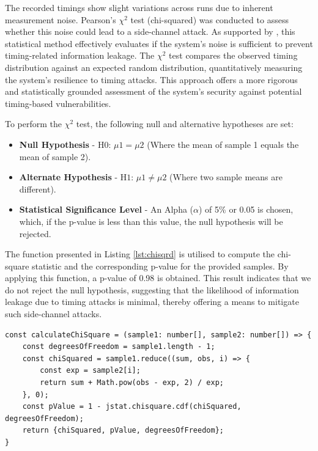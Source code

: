The recorded timings show slight variations across runs due to inherent measurement noise. Pearson's $\chi^2$ test (chi-squared) was conducted to assess whether this noise could lead to a side-channel attack. As supported by \cite{chisquare}, this statistical method effectively evaluates if the system's noise is sufficient to prevent timing-related information leakage. The $\chi^2$ test compares the observed timing distribution against an expected random distribution, quantitatively measuring the system's resilience to timing attacks. This approach offers a more rigorous and statistically grounded assessment of the system's security against potential timing-based vulnerabilities.

To perform the $\chi^2$ test, the following null and alternative hypotheses are set:
\begin{itemize}
    \item \textbf{Null Hypothesis} - H$0$: $\mu1 = \mu2$ (Where the mean of sample 1 equals the mean of sample 2).
    \item \textbf{Alternate Hypothesis} - H$1$: $\mu1 \neq \mu2$  (Where two sample means are different).   
    \item \textbf{Statistical Significance Level} - An Alpha ($\alpha$) of 5\% or 0.05 is chosen, which, if the p-value is less than this value, the null hypothesis will be rejected. 
\end{itemize}

The function presented in Listing \ref{lst:chisqrd} is utilised to compute the chi-square statistic and the corresponding p-value for the provided samples. By applying this function, a p-value of 0.98 is obtained. This result indicates that we do not reject the null hypothesis, suggesting that the likelihood of information leakage due to timing attacks is minimal, thereby offering a means to mitigate such side-channel attacks.

\newpage
\begin{lstlisting}[style=typescript,caption=chi-squared calculation ,label=lst:chisqrd]
const calculateChiSquare = (sample1: number[], sample2: number[]) => {
    const degreesOfFreedom = sample1.length - 1;
    const chiSquared = sample1.reduce((sum, obs, i) => {
        const exp = sample2[i];
        return sum + Math.pow(obs - exp, 2) / exp;
    }, 0);
    const pValue = 1 - jstat.chisquare.cdf(chiSquared, degreesOfFreedom);
    return {chiSquared, pValue, degreesOfFreedom};
}
\end{lstlisting}

